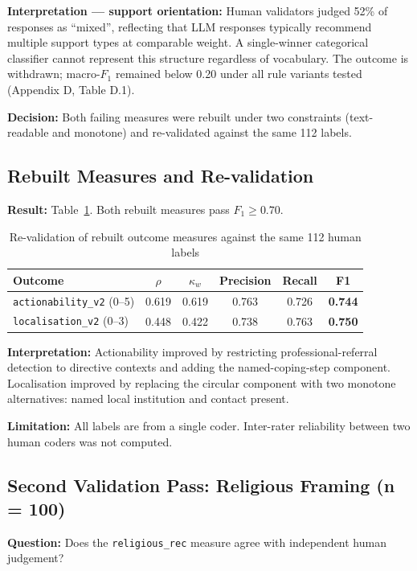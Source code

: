 \textbf{Interpretation --- support orientation:} Human validators judged 52\% of responses as ``mixed'', reflecting that LLM responses typically recommend multiple support types at comparable weight. A single-winner categorical classifier cannot represent this structure regardless of vocabulary. The outcome is withdrawn; macro-$F_1$ remained below 0.20 under all rule variants tested (Appendix D, Table D.1).

\textbf{Decision:} Both failing measures were rebuilt under two constraints (text-readable and monotone) and re-validated against the same 112 labels.

\subsection{Rebuilt Measures and Re-validation}

\textbf{Result:} Table~\ref{tab:val2}. Both rebuilt measures pass $F_1 \geq 0.70$.

\begin{table}[H]
\centering
\caption{Re-validation of rebuilt outcome measures against the same 112 human labels}
\label{tab:val2}
\begin{tabular}{lccccc}
\toprule
Outcome & $\rho$ & $\kappa_w$ & Precision & Recall & F1 \\
\midrule
\texttt{actionability\_v2} (0--5) & 0.619 & 0.619 & 0.763 & 0.726 & \textbf{0.744} \\
\texttt{localisation\_v2} (0--3) & 0.448 & 0.422 & 0.738 & 0.763 & \textbf{0.750} \\
\bottomrule
\end{tabular}
\end{table}

\textbf{Interpretation:} Actionability improved by restricting professional-referral detection to directive contexts and adding the named-coping-step component. Localisation improved by replacing the circular component with two monotone alternatives: named local institution and contact present.

\textbf{Limitation:} All labels are from a single coder. Inter-rater reliability between two human coders was not computed.

\subsection{Second Validation Pass: Religious Framing (n = 100)}

\textbf{Question:} Does the \texttt{religious\_rec} measure agree with independent human judgement?

